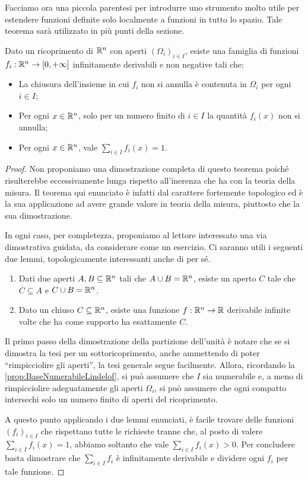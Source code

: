 Facciamo ora una piccola parentesi per introdurre uno strumento molto utile per estendere funzioni definite solo localmente a funzioni in tutto lo spazio. Tale teorema sarà utilizzato in più punti della sezione.

\begin{theorem}\label{thm:PartizioneUnita}
	Dato un ricoprimento di $\mathbb R^n$ con aperti $(\Omega_i)_{i\in I}$, esiste una famiglia di funzioni $f_i:\mathbb R^n\to[0,+\infty]$ infinitamente derivabili
	e non negative tali che:
	\begin{itemize}
		\item La chiusura dell'insieme in cui $f_i$ non si annulla è contenuta in $\Omega_i$ per ogni $i\in I$;
		\item Per ogni $x\in\mathbb R^n$, solo per un numero finito di $i\in I$ la quantità $f_i(x)$ non si annulla;
		\item Per ogni $x\in\mathbb R^n$, vale $\sum_{i\in I} f_i(x)=1$.
	\end{itemize}
\end{theorem}
\begin{proof}
	Non proponiamo una dimostrazione completa di questo teorema poiché risulterebbe eccessivamente lunga rispetto all'inerenza che ha con la teoria della misura. Il teorema qui enunciato è infatti dal carattere fortemente topologico ed è la sua applicazione ad avere grande valore in teoria della misura, piuttosto che la sua dimostrazione.
	
	In ogni caso, per completezza, proponiamo al lettore interessato una via dimostrativa guidata, da considerare come un esercizio.
	Ci saranno utili i seguenti due lemmi, topologicamente interessanti anche di per sé.
	\begin{enumerate}
		\item Dati due aperti $A,B\subseteq \mathbb R^n$ tali che $A\cup B=\mathbb R^n$, esiste un aperto $C$ tale che $\overline{C}\subseteq A$ e $C\cup B=\mathbb R^n$.
		\item Dato un chiuso $C\subseteq \mathbb R^n$, esiste una funzione $f:\mathbb R^n\to\mathbb R$ derivabile infinite volte che ha come supporto ha esattamente $C$.
	\end{enumerate}
	
	Il primo passo della dimostrazione della partizione dell'unità è notare che se si dimostra la tesi per un sottoricoprimento, anche ammettendo di poter ``rimpicciolire gli aperti'', la tesi generale segue facilmente. 
	Allora, ricordando la \cref{prop:BaseNumerabileLindelof}, si può assumere che $I$ sia numerabile e, a meno di rimpicciolire adeguatamente gli aperti $\Omega_i$, si può assumere che ogni compatto intersechi solo un numero finito di aperti del ricoprimento.
	
	A questo punto applicando i due lemmi enunciati, è facile trovare delle funzioni $(f_i)_{i\in I}$ che rispettano tutte le richieste tranne che, al posto di valere $\sum_{i\in I} f_i(x)=1$, abbiamo soltanto che vale $\sum_{i\in I} f_i(x)>0$.
	Per concludere basta dimostrare che $\sum_{i\in I}f_i$ è infinitamente derivabile e dividere ogni $f_i$ per tale funzione.
\end{proof}

